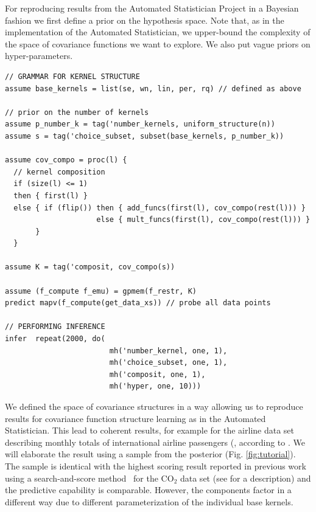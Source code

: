 For reproducing results from the Automated Statistician Project in a Bayesian fashion we first define a prior on the hypothesis space. Note that, as in the implementation of the Automated Statistician, we upper-bound the complexity of the space of covariance functions we want to explore. We also put vague priors on hyper-parameters.

\begin{minipage}{\linewidth}
\small
\belowcaptionskip=-10pt
\begin{lstlisting}[frame=single,mathescape,label=alg:structureVent,basicstyle=\selectfont\ttfamily]
// GRAMMAR FOR KERNEL STRUCTURE
assume base_kernels = list(se, wn, lin, per, rq) // defined as above

// prior on the number of kernels
assume p_number_k = tag('number_kernels, uniform_structure(n))
assume s = tag('choice_subset, subset(base_kernels, p_number_k))

assume cov_compo = proc(l) {
  // kernel composition
  if (size(l) <= 1)
  then { first(l) }
  else { if (flip()) then { add_funcs(first(l), cov_compo(rest(l))) }
                     else { mult_funcs(first(l), cov_compo(rest(l))) }
       }
  }
                          
assume K = tag('composit, cov_compo(s))

assume (f_compute f_emu) = gpmem(f_restr, K)
predict mapv(f_compute(get_data_xs)) // probe all data points

// PERFORMING INFERENCE  
infer  repeat(2000, do(
                        mh('number_kernel, one, 1),
                        mh('choice_subset, one, 1),
                        mh('composit, one, 1),
                        mh('hyper, one, 10)))
\end{lstlisting}

\end{minipage}




We defined the space of covariance structures in a way allowing us to reproduce results for covariance function structure learning as in the Automated Statistician. This lead to coherent results, for example for the airline data set describing monthly totals of international airline passengers (\citealp{box2011time}, according to \citealp{duvenaud2013structure}. We will elaborate the result using a sample from the posterior (Fig. \ref{fig:tutorial}). The sample is identical with the highest scoring result reported in previous work using a search-and-score method~\citep{duvenaud2013structure} for the CO$_2$ data set (see \citealp{rasmussen2006gaussian} for a description) and the predictive capability is comparable. However, the components factor in a different way due to different parameterization of the individual base kernels.

